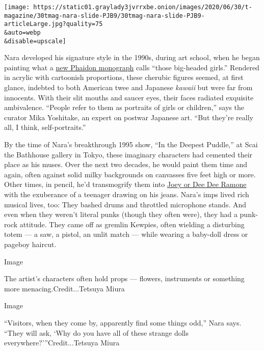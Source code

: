 \texttt{[image: https://static01.graylady3jvrrxbe.onion/images/2020/06/30/t-magazine/30tmag-nara-slide-PJB9/30tmag-nara-slide-PJB9-articleLarge.jpg?quality=75\\\&auto=webp\\\&disable=upscale]}

Nara developed his signature style in the 1990s, during art school, when
he began painting what a
\href{https://www.phaidon.com/store/art/yoshitomo-nara-9780714879949/}{new
Phaidon monograph} calls ``those big-headed girls.'' Rendered in acrylic
with cartoonish proportions, these cherubic figures seemed, at first
glance, indebted to both American twee and Japanese \emph{kawaii} but
were far from innocents. With their slit mouths and saucer eyes, their
faces radiated exquisite ambivalence. ``People refer to them as
portraits of girls or children,'' says the curator Mika Yoshitake, an
expert on postwar Japanese art. ``But they're really all, I think,
self-portraits.''

By the time of Nara's breakthrough 1995 show, ``In the Deepest Puddle,''
at Scai the Bathhouse gallery in Tokyo, these imaginary characters had
cemented their place as his muses. Over the next two decades, he would
paint them time and again, often against solid milky backgrounds on
canvasses five feet high or more. Other times, in pencil, he'd
transmogrify them into
\href{https://www.nytimes3xbfgragh.onion/2016/04/15/arts/music/his-brothers-keeper-a-ramones-tour-of-queens.html}{Joey
or Dee Dee Ramone} with the exuberance of a teenager drawing on his
jeans. Nara's imps lived rich musical lives, too: They bashed drums and
throttled microphone stands. And even when they weren't literal punks
(though they often were), they had a punk-rock attitude. They came off
as gremlin Kewpies, often wielding a disturbing totem --- a saw, a
pistol, an unlit match --- while wearing a baby-doll dress or pageboy
haircut.

Image

The artist's characters often hold props --- flowers, instruments or
something more menacing.Credit...Tetsuya Miura

Image

``Visitors, when they come by, apparently find some things odd,'' Nara
says. ``They will ask, `Why do you have all of these strange dolls
everywhere?'''Credit...Tetsuya Miura


